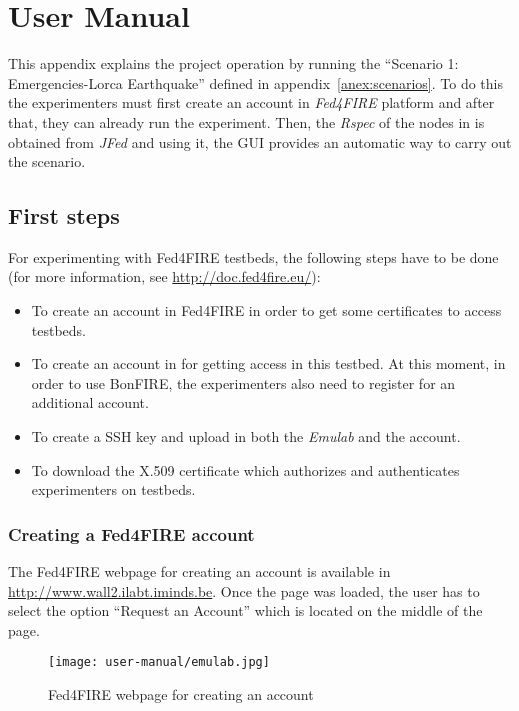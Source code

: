 \chapter{User Manual}

This appendix explains the project operation by running the ``Scenario 1:
Emergencies-Lorca Earthquake'' defined in appendix~\ref{anex:scenarios}. To do
this the experimenters must first create an account in \emph{Fed4FIRE} platform
and after that, they can already run the experiment. Then, the \emph{Rspec} of the nodes in
\vw is obtained from \emph{JFed} and using it, the \ac{GUI} provides an
automatic way to carry out the scenario.

\section{First steps}

For experimenting with Fed4FIRE testbeds, the following steps have to be
done (for more information, see \url{http://doc.fed4fire.eu/}): 
\begin{itemize}
\item To create an account in Fed4FIRE in order to get some certificates
  to access testbeds.
\item To create an account in \bonfire for getting access in this testbed. At
  this moment, in order to use BonFIRE, the experimenters also need to register for an additional account. 
\item To create a \ac{SSH} key and upload in both the \emph{Emulab} and the
  \bonfire account.
\item To download the X.509 certificate which authorizes and authenticates
  experimenters on testbeds.
\end{itemize}

\subsection{Creating a Fed4FIRE account}

The Fed4FIRE webpage for creating an account is available in
\url{http://www.wall2.ilabt.iminds.be}. Once the page was loaded, the user has
to select the option ``Request an Account'' which is located on the middle of the page.

\begin{figure}[!h]
\begin{center}
\texttt{[image: user-manual/emulab.jpg]}
\caption{Fed4FIRE webpage for creating an account}
\label{fig:fed4fire-account}
\end{center}
\end{figure}

